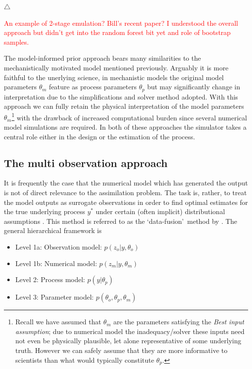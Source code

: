 \documentclass[10pt,a4paper]{article}
\newcommand\xqed[1]{%
  \leavevmode\unskip\penalty9999 \hbox{}\nobreak\hfill
  \quad\hbox{#1}}
\newcommand\demo{\xqed{$\triangle$}}
\newcommand{\red}{\textcolor{red}}
\begin{document}
\demo

\red{An example of 2-stage emulation? Bill's recent paper? I understood the overall approach but didn't get into the random forest bit yet and role of bootstrap samples.}


The model-informed prior approach bears many similarities to the mechanistically motivated model mentioned previously. Arguably it is more faithful to the unerlying science, in mechanistic models the original model parameters $\theta_m$ feature as process parameters $\theta_p$ but may significantly change in interpretation due to the simplifications and solver method adopted. With this approach we can fully retain the physical interpretation of the model parameters $\theta_m$\footnote{Recall we have assumed that $\theta_m$ are the parameters satisfying the \emph{Best input assumption}; due to numerical model the inadequacy/solver these inputs need not even be physically plausible, let alone representative of some underlying truth. However we can safely assume that they are more informative to scientists than what would typically constitute $\theta_p$.} with the drawback of increased computational burden since several numerical model simulations are required. In both of these approaches the simulator takes a central role either in the design or the estimation of the process. 



\subsection{The multi observation approach}

It is frequently the case that the numerical model which has generated the output is not of direct relevance to the assimilation problem. The task is, rather, to treat the model outputs as surrogate observations in order to find optimal estimates for the true underlying process $y^*$ under certain (often implicit) distributional assumptions \citep{Berliner_2012}. This method is referred to as the \lq data-fusion\rq~method by \cite{Gelfand_2009}. The general hierarchical framework is
\begin{itemize}
\item Level 1a: Observation model: $p(z_o | y, \theta_o)$
\item Level 1b: Numerical model: $p(z_m | y, \theta_m)$
\item Level 2: Process model: $p(y | \theta_p)$
\item Level 3: Parameter model: $p(\theta_o, \theta_p, \theta_m)$
\end{itemize}
\end{document}
